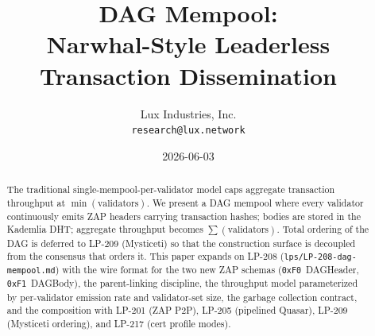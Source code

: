 \documentclass[11pt,a4paper]{article}
\title{DAG Mempool:\\
       Narwhal-Style Leaderless Transaction Dissemination}
\author{Lux Industries, Inc. \\
        \texttt{research@lux.network}}
\date{2026-06-03}
\begin{document}
\luxcoverpage

\begin{abstract}
The traditional single-mempool-per-validator model caps aggregate
transaction throughput at $\min(\textrm{validators})$. We present a
DAG mempool where every validator continuously emits ZAP headers
carrying transaction hashes; bodies are stored in the Kademlia DHT;
aggregate throughput becomes $\sum(\textrm{validators})$. Total
ordering of the DAG is deferred to LP-209 (Mysticeti) so that the
construction surface is decoupled from the consensus that orders it.
This paper expands on LP-208 (\texttt{lps/LP-208-dag-mempool.md})
with the wire format for the two new ZAP schemas
(\texttt{0xF0}~DAGHeader, \texttt{0xF1}~DAGBody), the parent-linking
discipline, the throughput model parameterized by per-validator
emission rate and validator-set size, the garbage collection contract,
and the composition with LP-201 (ZAP P2P), LP-205 (pipelined Quasar),
LP-209 (Mysticeti ordering), and LP-217 (cert profile modes).
\end{abstract}

\tableofcontents
\newpage










\end{document}
